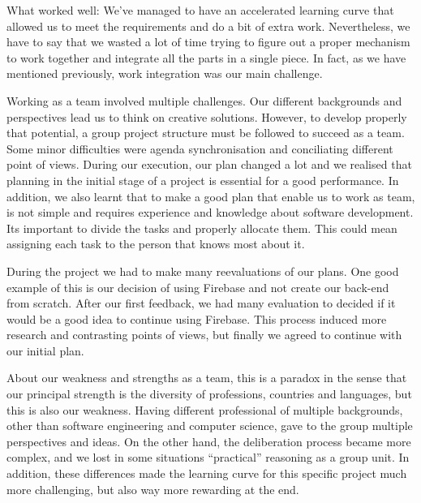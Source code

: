 What worked well: We've managed to have an accelerated learning curve that allowed us to meet the requirements and do a bit of extra work. Nevertheless, we have  to say that we wasted a lot of time trying to figure out a proper mechanism to work together and integrate all the parts in a single piece. In fact, as we have mentioned previously, work integration was our main challenge. 

Working as a team involved multiple challenges. Our different backgrounds and perspectives lead us to think on creative solutions. However, to develop properly that potential, a group project structure must be followed to succeed as a team. Some minor difficulties were agenda synchronisation and conciliating different point of views. 
During our execution, our plan changed a lot and we realised that planning in the initial stage of a project is essential for a good performance. In addition, we also learnt that to make a good plan that enable us to work as team, is not simple and requires experience and knowledge about software development. Its important to divide the tasks and properly allocate them. This could mean assigning each task to the person that knows most about it.

During the project we had to make many reevaluations of our plans. One good example of this is our decision of using Firebase and not create our back-end from scratch. After our first feedback, we had many evaluation to decided if it would be a good idea to continue using Firebase. This process induced more research and contrasting points of views, but finally we agreed to continue with our initial plan.

About our weakness and strengths as a team, this is a paradox in the sense that our principal strength is the diversity of professions, countries and languages, but this is also our weakness. Having different professional of multiple backgrounds, other than software engineering and computer science, gave to the group multiple perspectives and ideas. On the other hand, the deliberation process became more complex, and we lost in some situations “practical” reasoning as a group unit. In addition, these differences made the learning curve for this specific project much more challenging, but also way more rewarding at the end. 

